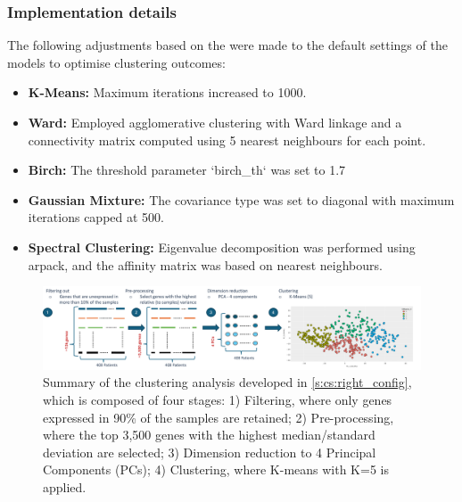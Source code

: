\subsubsection*{Implementation details}
The following adjustments based on the \citet{Scikit-learn_undated-ax} were made to the default settings of the models to optimise clustering outcomes:
\begin{itemize}
    \item \textbf{K-Means:} Maximum iterations increased to 1000.
    \item \textbf{Ward:} Employed agglomerative clustering with Ward linkage and a connectivity matrix computed using 5 nearest neighbours for each point.
    \item \textbf{Birch:} The threshold parameter `birch\_th` was set to 1.7
    \item \textbf{Gaussian Mixture:} The covariance type was set to diagonal with maximum iterations capped at 500.
    \item \textbf{Spectral Clustering:} Eigenvalue decomposition was performed using arpack, and the affinity matrix was based on nearest neighbours.
\end{itemize}

\begin{figure}
    \centering
    \includegraphics[width=1.0\textwidth,height=1.0\textheight,keepaspectratio]{Sections/ClusteringAnalysis/Resources/clustering_pipeline.png}
    \caption{Summary of the clustering analysis developed in \cref{s:cs:right_config}, which is composed of four stages: 1) Filtering, where only genes expressed in 90\% of the samples are retained; 2) Pre-processing, where the top 3,500 genes with the highest median/standard deviation are selected; 3) Dimension reduction to 4 Principal Components (PCs); 4) Clustering, where K-means with K=5 is applied.}
    \label{fig:cs:clustering_pipeline}
\end{figure}
